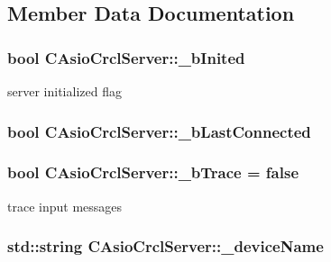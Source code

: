 \subsection{Member Data Documentation}
\hypertarget{classCAsioCrclServer_a1b68e1872f4b8bba8def3e433a2f2f92}{
\subsubsection[{\-\_\-b\-Inited}]{\setlength{\rightskip}{0pt plus 5cm}bool C\-Asio\-Crcl\-Server\-::\-\_\-b\-Inited}}\label{classCAsioCrclServer_a1b68e1872f4b8bba8def3e433a2f2f92}
server initialized flag \hypertarget{classCAsioCrclServer_a8981e762f986843227b5df9e256a1614}{
\subsubsection[{\-\_\-b\-Last\-Connected}]{\setlength{\rightskip}{0pt plus 5cm}bool C\-Asio\-Crcl\-Server\-::\-\_\-b\-Last\-Connected}}\label{classCAsioCrclServer_a8981e762f986843227b5df9e256a1614}
\hypertarget{classCAsioCrclServer_ae2ed42c399a04caf7af7b2c1e7e98d9a}{
\subsubsection[{\-\_\-b\-Trace}]{\setlength{\rightskip}{0pt plus 5cm}bool C\-Asio\-Crcl\-Server\-::\-\_\-b\-Trace = false\hspace{0.3cm}{\ttfamily [static]}}}\label{classCAsioCrclServer_ae2ed42c399a04caf7af7b2c1e7e98d9a}
trace input messages \hypertarget{classCAsioCrclServer_a70d2177e5e78081e8296c1c0409763d2}{
\subsubsection[{\-\_\-device\-Name}]{\setlength{\rightskip}{0pt plus 5cm}std\-::string C\-Asio\-Crcl\-Server\-::\-\_\-device\-Name}}\label{classCAsioCrclServer_a70d2177e5e78081e8296c1c0409763d2}
